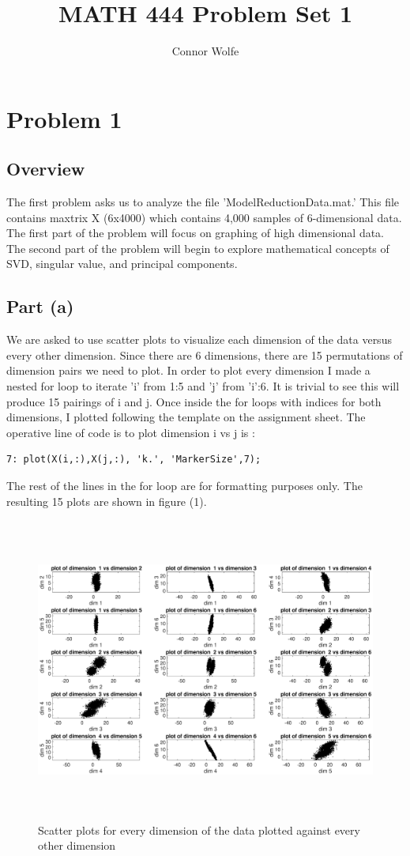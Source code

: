 \documentclass{article}
\title{MATH 444 Problem Set 1}
\author{Connor Wolfe}
\begin{document}
\maketitle

\pagebreak
\section*{Problem 1}

\subsection*{Overview}
The first problem asks us to analyze the file 'ModelReductionData.mat.' This file contains maxtrix X (6x4000) which contains 4,000 samples of 6-dimensional data.    The first part of the problem will focus on graphing of high dimensional data.  The second part of the problem will begin to explore mathematical concepts of SVD, singular value, and principal components.

\subsection*{Part (a)}
We are asked to use scatter plots to visualize each dimension of the data versus every other dimension.  Since there are 6 dimensions, there are 15 permutations of dimension pairs we need to plot.  In order to plot every dimension I made a nested for loop to iterate 'i' from 1:5 and 'j' from 'i':6. It is trivial to see this will produce 15 pairings of i and j.  Once inside the for loops with indices for both dimensions, I plotted following the template on the assignment sheet.  The operative line of code is to plot dimension i vs j is :
\begin{verbatim}7: plot(X(i,:),X(j,:), 'k.', 'MarkerSize',7);\end{verbatim}
The rest of the lines in the for loop are for formatting purposes only.  The resulting 15 plots are shown in figure (1).  

 \begin{figure}[h!]
    \centerline
    {
    \includegraphics[width=15cm, height=10cm] {Q_1_a_plots}
    }
    \caption{\label{fig:my figure} Scatter plots for every dimension of the data plotted against every other dimension }
\end{figure}
\end{document}
